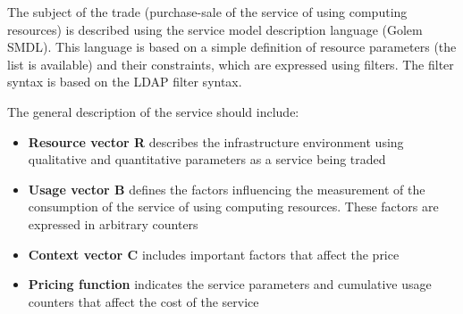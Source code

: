 
\newpage

The subject of the trade (purchase-sale of the service of using computing resources)
is described using the service model description language (Golem SMDL).
This language is based on a simple definition of resource parameters (the list is available) and their constraints, which are expressed using filters.
The filter syntax is based on the LDAP filter syntax.

The general description of the service should include:

\begin{itemize}
\item {\bf Resource vector R} describes the infrastructure environment using qualitative and quantitative parameters as a service being traded
\item {\bf Usage vector B} defines the factors influencing the measurement of the consumption of the service of using computing resources. These factors are expressed in arbitrary counters
\item {\bf Context vector C} includes important factors that affect the price
\item {\bf Pricing function} indicates the service parameters and cumulative usage counters that affect the cost of the service
\end{itemize}

